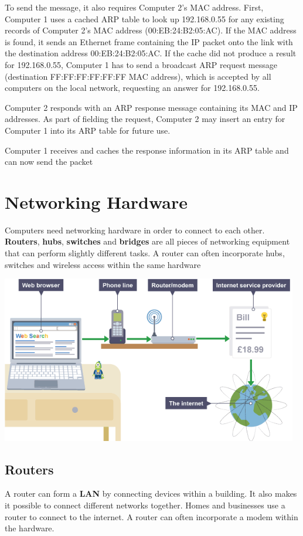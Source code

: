 \documentclass[a4paper,12pt]{article}
\begin{document}
To send the message, it also requires Computer 2's MAC address. First, Computer 1 uses a cached ARP table to look up 192.168.0.55 for any existing records of Computer 2's MAC address (00:EB:24:B2:05:AC). If the MAC address is found, it sends an Ethernet frame containing the IP packet onto the link with the destination address 00:EB:24:B2:05:AC. If the cache did not produce a result for 192.168.0.55, Computer 1 has to send a broadcast ARP request message (destination FF:FF:FF:FF:FF:FF MAC address), which is accepted by all computers on the local network, requesting an answer for 192.168.0.55.

Computer 2 responds with an ARP response message containing its MAC and IP addresses. As part of fielding the request, Computer 2 may insert an entry for Computer 1 into its ARP table for future use.

Computer 1 receives and caches the response information in its ARP table and can now send the packet

\clearpage

\section{Networking Hardware}
Computers need networking hardware in order to connect to each other. \textbf{Routers}, \textbf{hubs}, \textbf{switches} and \textbf{bridges} are all pieces of networking equipment that can perform slightly different tasks. A router can often incorporate hubs, switches and wireless access within the same hardware

\includegraphics[width=13cm]{./large.PNG}

\subsection{Routers}
A router can form a \textbf{LAN} by connecting devices within a building. It also makes it possible to connect different networks together. Homes and businesses use a router to connect to the internet. A router can often incorporate a modem within the hardware.
\end{document}
